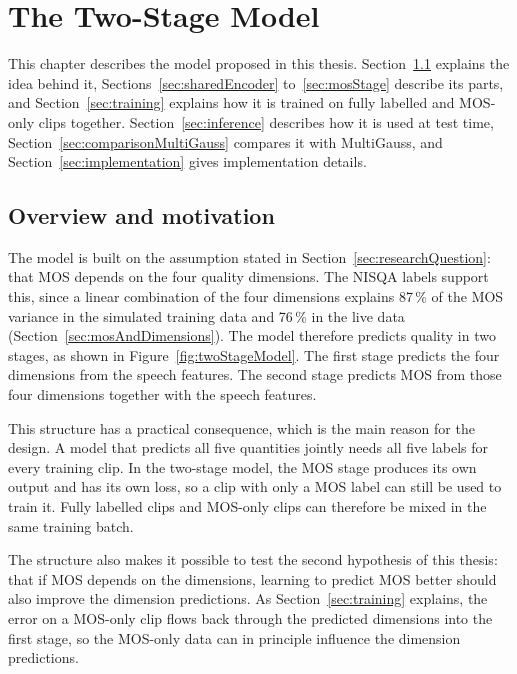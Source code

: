 \documentclass[
english,                 %
bibtex,                  %
includeExtraAbstracts, %
]{kththesis}
\numberwithin{listing}{chapter}
\begin{document}
\cleardoublepage
\chapter{The Two-Stage Model}
\label{ch:whatYouDid}

This chapter describes the model proposed in this thesis. Section~\ref{sec:modelOverview} explains the idea behind it, Sections~\ref{sec:sharedEncoder} to~\ref{sec:mosStage} describe its parts, and Section~\ref{sec:training} explains how it is trained on fully labelled and MOS-only clips together. Section~\ref{sec:inference} describes how it is used at test time, Section~\ref{sec:comparisonMultiGauss} compares it with MultiGauss, and Section~\ref{sec:implementation} gives implementation details.

\section{Overview and motivation}
\label{sec:modelOverview}

The model is built on the assumption stated in Section~\ref{sec:researchQuestion}: that MOS depends on the four quality dimensions. The NISQA labels support this, since a linear combination of the four dimensions explains 87\,\% of the MOS variance in the simulated training data and 76\,\% in the live data (Section~\ref{sec:mosAndDimensions}). The model therefore predicts quality in two stages, as shown in Figure~\ref{fig:twoStageModel}. The first stage predicts the four dimensions from the speech features. The second stage predicts MOS from those four dimensions together with the speech features.

This structure has a practical consequence, which is the main reason for the design. A model that predicts all five quantities jointly needs all five labels for every training clip. In the two-stage model, the MOS stage produces its own output and has its own loss, so a clip with only a MOS label can still be used to train it. Fully labelled clips and MOS-only clips can therefore be mixed in the same training batch.

The structure also makes it possible to test the second hypothesis of this thesis: that if MOS depends on the dimensions, learning to predict MOS better should also improve the dimension predictions. As Section~\ref{sec:training} explains, the error on a MOS-only clip flows back through the predicted dimensions into the first stage, so the MOS-only data can in principle influence the dimension predictions.
\end{document}
